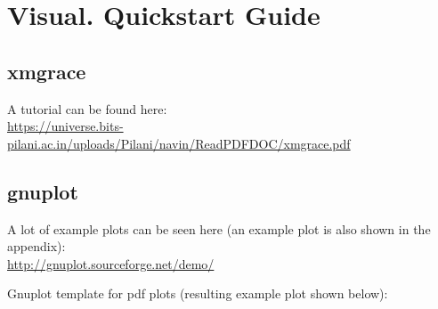 \documentclass[
  letterpaper,
  DIV=11,
  numbers=noendperiod]{scrreprt}
\begin{document}
\hypertarget{visual.-quickstart-guide}{%
\chapter{Visual. Quickstart Guide}\label{visual.-quickstart-guide}}

\hypertarget{xmgrace}{%
\section{xmgrace}\label{xmgrace}}

A tutorial can be found here:\\
\url{https://universe.bits-pilani.ac.in/uploads/Pilani/navin/ReadPDFDOC/xmgrace.pdf}

\hypertarget{gnuplot}{%
\section{gnuplot}\label{gnuplot}}

A lot of example plots can be seen here (an example plot is also shown
in the appendix):\\
\url{http://gnuplot.sourceforge.net/demo/}

Gnuplot template for pdf plots (resulting example plot shown below):
\end{document}
